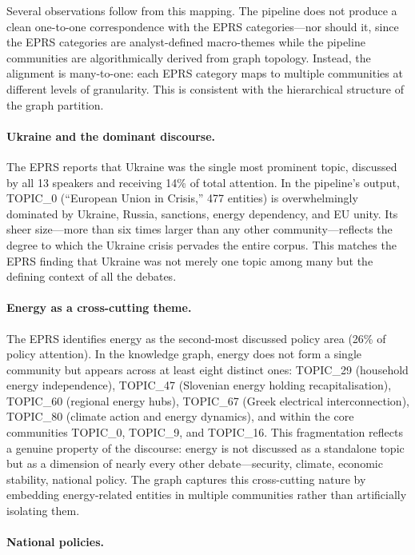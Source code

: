 \documentclass[11pt]{article}
\begin{document}
Several observations follow from this mapping. The pipeline does not produce a clean one-to-one correspondence with the EPRS categories---nor should it, since the EPRS categories are analyst-defined macro-themes while the pipeline communities are algorithmically derived from graph topology. Instead, the alignment is many-to-one: each EPRS category maps to multiple communities at different levels of granularity. This is consistent with the hierarchical structure of the graph partition.

\paragraph{Ukraine and the dominant discourse.}

The EPRS reports that Ukraine was the single most prominent topic, discussed by all 13 speakers and receiving 14\% of total attention. In the pipeline's output, TOPIC\_0 (``European Union in Crisis,'' 477 entities) is overwhelmingly dominated by Ukraine, Russia, sanctions, energy dependency, and EU unity. Its sheer size---more than six times larger than any other community---reflects the degree to which the Ukraine crisis pervades the entire corpus. This matches the EPRS finding that Ukraine was not merely one topic among many but the defining context of all the debates.

\paragraph{Energy as a cross-cutting theme.}

The EPRS identifies energy as the second-most discussed policy area (26\% of policy attention). In the knowledge graph, energy does not form a single community but appears across at least eight distinct ones: TOPIC\_29 (household energy independence), TOPIC\_47 (Slovenian energy holding recapitalisation), TOPIC\_60 (regional energy hubs), TOPIC\_67 (Greek electrical interconnection), TOPIC\_80 (climate action and energy dynamics), and within the core communities TOPIC\_0, TOPIC\_9, and TOPIC\_16. This fragmentation reflects a genuine property of the discourse: energy is not discussed as a standalone topic but as a dimension of nearly every other debate---security, climate, economic stability, national policy. The graph captures this cross-cutting nature by embedding energy-related entities in multiple communities rather than artificially isolating them.

\paragraph{National policies.}
\end{document}

